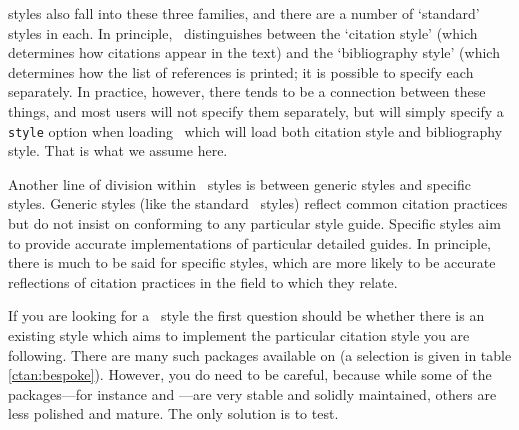  styles also fall into these three families, and
there are a number of `standard' styles in each. In principle,
\biblatex\ distinguishes between the `citation
style' (which
determines how citations appear in the text) and the `bibliography
style' (which
determines how the list of references is printed; it is possible to
specify each separately.
In practice, however, there tends to be a
connection between these things, and most users will not specify them
separately, but will simply specify a \verb|style| option when loading
\biblatex\, which will load both citation style and bibliography
style. That is what we assume here.

Another line of division within \biblatex\ styles is between generic
styles and specific styles.
Generic styles (like the standard
\biblatex\ styles) reflect common citation practices but do not insist
on conforming to any particular style guide. Specific styles aim to
provide accurate implementations of particular detailed guides. In
principle, there is much to be said for specific styles, which are
more likely to be accurate reflections of citation practices in the
field to which they relate.

If you are looking for a \biblatex\ style the first question should be
whether there is an existing style which aims to implement the
particular citation style you are following. There are many such
packages available on  (a selection is given in table
\ref{ctan:bespoke}). However, you do need to be careful, because while
some of the packages---for instance  and
---are very stable and solidly maintained,
others are less polished and mature. The only solution is to test.

